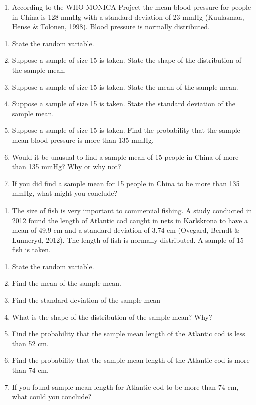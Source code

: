 \documentclass[]{book}
\providecommand{\tightlist}{%
  \setlength{\itemsep}{0pt}\setlength{\parskip}{0pt}}
\begin{document}
\begin{enumerate}
\def\labelenumi{\arabic{enumi}.}
\setcounter{enumi}{3}
\tightlist
\item
  According to the WHO MONICA Project the mean blood pressure for people in China is 128 mmHg with a standard deviation of 23 mmHg (Kuulasmaa, Hense \& Tolonen, 1998). Blood pressure is normally distributed.
\end{enumerate}

\begin{enumerate}
\def\labelenumi{\alph{enumi}.}
\tightlist
\item
  State the random variable.
\item
  Suppose a sample of size 15 is taken. State the shape of the distribution of the sample mean.
\item
  Suppose a sample of size 15 is taken. State the mean of the sample mean.
\item
  Suppose a sample of size 15 is taken. State the standard deviation of the sample mean.
\item
  Suppose a sample of size 15 is taken. Find the probability that the sample mean blood pressure is more than 135 mmHg.
\item
  Would it be unusual to find a sample mean of 15 people in China of more than 135 mmHg? Why or why not?
\item
  If you did find a sample mean for 15 people in China to be more than 135 mmHg, what might you conclude?
\end{enumerate}

\begin{enumerate}
\def\labelenumi{\arabic{enumi}.}
\setcounter{enumi}{4}
\tightlist
\item
  The size of fish is very important to commercial fishing. A study conducted in 2012 found the length of Atlantic cod caught in nets in Karlskrona to have a mean of 49.9 cm and a standard deviation of 3.74 cm (Ovegard, Berndt \& Lunneryd, 2012). The length of fish is normally distributed. A sample of 15 fish is taken.
\end{enumerate}

\begin{enumerate}
\def\labelenumi{\alph{enumi}.}
\tightlist
\item
  State the random variable.
\item
  Find the mean of the sample mean.
\item
  Find the standard deviation of the sample mean
\item
  What is the shape of the distribution of the sample mean? Why?
\item
  Find the probability that the sample mean length of the Atlantic cod is less than 52 cm.
\item
  Find the probability that the sample mean length of the Atlantic cod is more than 74 cm.
\item
  If you found sample mean length for Atlantic cod to be more than 74 cm, what could you conclude?
\end{enumerate}
\end{document}
